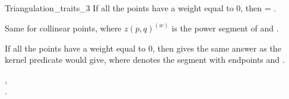 \begin{ccRefConcept}{Triangulation_traits_3}
If all the points have a weight equal to 0, then
 = .

{Same for collinear points, where ${z(p,q)}^{(w)}$ is the
power segment of  and .
}

If all the points have a weight equal to 0, then
 gives the same answer as the kernel predicate
 would give, where   denotes the
segment with endpoints  and .

\ccHasModels

,\\
.




\end{ccRefConcept}


